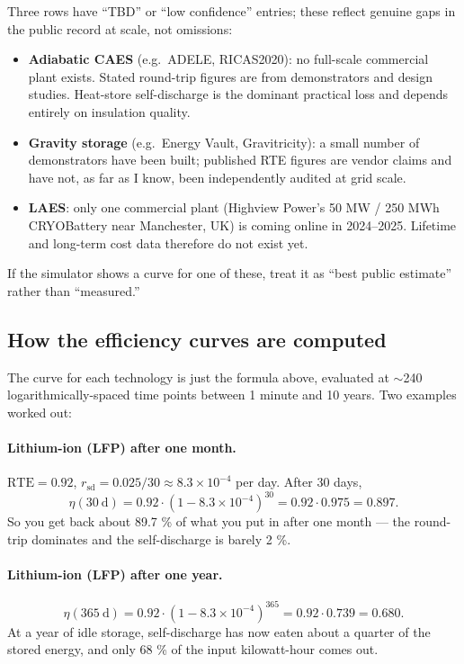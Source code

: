 Three rows have ``TBD'' or ``low confidence'' entries; these reflect
genuine gaps in the public record at scale, not omissions:

\begin{itemize}
    \item \textbf{Adiabatic CAES} (e.g.\ ADELE, RICAS2020): no
    full-scale commercial plant exists. Stated round-trip figures are
    from demonstrators and design studies. Heat-store self-discharge
    is the dominant practical loss and depends entirely on insulation
    quality.
    \item \textbf{Gravity storage} (e.g.\ Energy Vault, Gravitricity):
    a small number of demonstrators have been built; published RTE
    figures are vendor claims and have not, as far as I know, been
    independently audited at grid scale.
    \item \textbf{LAES}: only one commercial plant (Highview Power's
    50 MW / 250 MWh CRYOBattery near Manchester, UK) is coming online
    in 2024--2025. Lifetime and long-term cost data therefore do not
    exist yet.
\end{itemize}

If the simulator shows a curve for one of these, treat it as
``best public estimate'' rather than ``measured.''

\subsection*{How the efficiency curves are computed}

The curve for each technology is just the formula above, evaluated
at $\sim$240 logarithmically-spaced time points between 1 minute and
10 years. Two examples worked out:

\paragraph{Lithium-ion (LFP) after one month.}
$\mathrm{RTE} = 0.92$, $r_{\mathrm{sd}} = 0.025 / 30 \approx 8.3 \times 10^{-4}$
per day. After 30 days,
\[
\eta(30\ \text{d}) = 0.92 \cdot (1 - 8.3\times 10^{-4})^{30}
 = 0.92 \cdot 0.975 = 0.897.
\]
So you get back about 89.7 \% of what you put in after one month --- the
round-trip dominates and the self-discharge is barely 2 \%.

\paragraph{Lithium-ion (LFP) after one year.}
\[
\eta(365\ \text{d}) = 0.92 \cdot (1 - 8.3\times 10^{-4})^{365}
 = 0.92 \cdot 0.739 = 0.680.
\]
At a year of idle storage, self-discharge has now eaten about a
quarter of the stored energy, and only 68 \% of the input
kilowatt-hour comes out.


